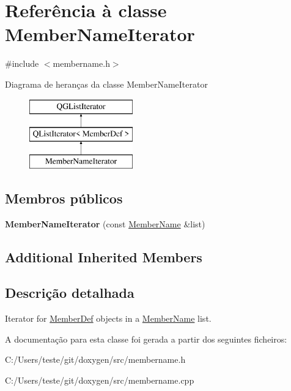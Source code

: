 \hypertarget{class_member_name_iterator}{\section{Referência à classe Member\-Name\-Iterator}
\label{class_member_name_iterator}
}


{\ttfamily \#include $<$membername.\-h$>$}

Diagrama de heranças da classe Member\-Name\-Iterator\begin{figure}[H]
\begin{center}
\leavevmode
\includegraphics[height=3.000000cm]{class_member_name_iterator}
\end{center}
\end{figure}
\subsection*{Membros públicos}
\begin{DoxyCompactItemize}
\item 
\hypertarget{class_member_name_iterator_abef3e9c206b16fb693b7e4f5edce7012}{{\bfseries Member\-Name\-Iterator} (const \hyperlink{class_member_name}{Member\-Name} \&list)}\label{class_member_name_iterator_abef3e9c206b16fb693b7e4f5edce7012}

\end{DoxyCompactItemize}
\subsection*{Additional Inherited Members}


\subsection{Descrição detalhada}
Iterator for \hyperlink{class_member_def}{Member\-Def} objects in a \hyperlink{class_member_name}{Member\-Name} list. 

A documentação para esta classe foi gerada a partir dos seguintes ficheiros\-:\begin{DoxyCompactItemize}
\item 
C\-:/\-Users/teste/git/doxygen/src/membername.\-h\item 
C\-:/\-Users/teste/git/doxygen/src/membername.\-cpp\end{DoxyCompactItemize}
